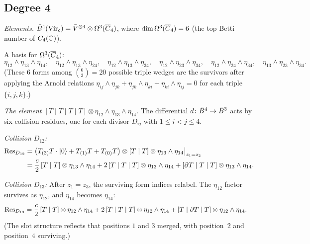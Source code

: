 \subsection{Degree 4}

\begin{computation}
\label{comp:virasoro-deg4-full}

\emph{Elements.}
$\bar{B}^4(\mathrm{Vir}_c) = \bar{V}^{\otimes 4}
\otimes \Omega^3(\overline{C}_4)$, where
$\dim \Omega^3(\overline{C}_4) = 6$
(the top Betti number of $C_4(\mathbb{C})$).

A basis for $\Omega^3(\overline{C}_4)$:
\begin{equation}\label{eq:form-basis-4}
\eta_{12} \wedge \eta_{13} \wedge \eta_{14}, \quad
\eta_{12} \wedge \eta_{13} \wedge \eta_{24}, \quad
\eta_{12} \wedge \eta_{13} \wedge \eta_{34}, \quad
\eta_{12} \wedge \eta_{23} \wedge \eta_{34}, \quad
\eta_{12} \wedge \eta_{24} \wedge \eta_{34}, \quad
\eta_{13} \wedge \eta_{23} \wedge \eta_{34}.
\end{equation}
(These $6$ forms among $\binom{6}{3} = 20$ possible triple wedges
are the survivors after applying the Arnold relations
$\eta_{ij} \wedge \eta_{jk} + \eta_{jk} \wedge \eta_{ki}
+ \eta_{ki} \wedge \eta_{ij} = 0$ for each triple $\{i,j,k\}$.)

\emph{The element $[T\mid T\mid T\mid T]
\otimes \eta_{12} \wedge \eta_{13} \wedge \eta_{14}$.}
The differential $d\colon \bar{B}^4 \to \bar{B}^3$ acts by six collision
residues, one for each divisor $D_{ij}$ with $1 \leq i < j \leq 4$.

\emph{Collision $D_{12}$:}
\begin{align*}
\operatorname{Res}_{D_{12}} &= \bigl(T_{(3)}T \cdot |0\rangle + T_{(1)}T
  + T_{(0)}T\bigr) \otimes [T \mid T]
  \otimes \eta_{13} \wedge \eta_{14}\big|_{z_1 = z_2} \\
&= \frac{c}{2}\,[T \mid T] \otimes \eta_{13} \wedge \eta_{14}
  + 2\,[T \mid T \mid T] \otimes \eta_{13} \wedge \eta_{14}
  + [\partial T \mid T \mid T] \otimes \eta_{13} \wedge \eta_{14}.
\end{align*}

\emph{Collision $D_{13}$:}
After $z_1 = z_3$, the surviving form indices relabel.
The $\eta_{12}$ factor survives as $\eta_{12}$, and $\eta_{14}$
becomes $\eta_{14}$:
\begin{align*}
\operatorname{Res}_{D_{13}} &= \frac{c}{2}\,[T \mid T] \otimes \eta_{12} \wedge \eta_{14}
  + 2\,[T \mid T \mid T] \otimes \eta_{12} \wedge \eta_{14}
  + [T \mid \partial T \mid T] \otimes \eta_{12} \wedge \eta_{14}.
\end{align*}
(The slot structure reflects that positions $1$ and $3$ merged,
with position~$2$ and position~$4$ surviving.)


\end{computation}
